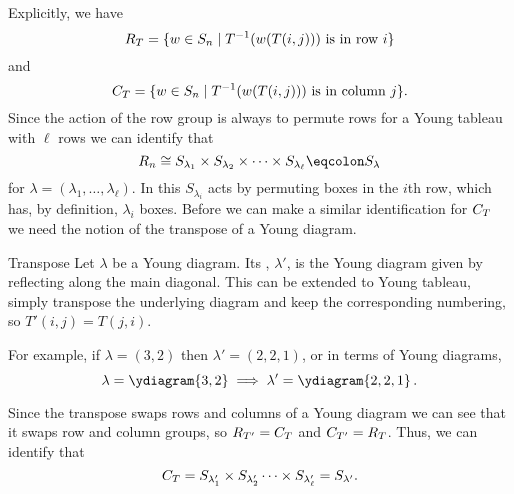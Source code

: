 Explicitly, we have
\begin{equation}
    R_T = \{w \in S_n \mid T^{-1}(w(T(i, j))) \text{ is in row } i\}
\end{equation}
and
\begin{equation}
    C_T = \{w \in S_n \mid T^{-1}(w(T(i, j))) \text{ is in column } j\}.
\end{equation}
Since the action of the row group is always to permute rows for a Young tableau with \(\ell\) rows we can identify that
\begin{equation}
    \rowGroup_n \isomorphic S_{\lambda_1} \times S_{\lambda_2} \times \dotsb \times S_{\lambda_\ell} \eqcolon S_\lambda
\end{equation}
for \(\lambda = (\lambda_1, \dotsc, \lambda_\ell)\).
In this \(S_{\lambda_i}\) acts by permuting boxes in the \(i\)th row, which has, by definition, \(\lambda_i\) boxes.
Before we can make a similar identification for \(C_T\) we need the notion of the transpose of a Young diagram.

\begin{dfn}{Transpose}{}
    Let \(\lambda\) be a Young diagram.
    Its , \(\lambda'\), is the Young diagram given by reflecting along the main diagonal.
    This can be extended to Young tableau, simply transpose the underlying diagram and keep the corresponding numbering, so \(T'(i, j) = T(j, i)\).
\end{dfn}

For example, if \(\lambda = (3, 2)\) then \(\lambda' = (2, 2, 1)\), or in terms of Young diagrams,
\begin{equation}
    \lambda = \ydiagram{3,2} \implies \lambda' = \ydiagram{2,2,1}\,.
\end{equation}

Since the transpose swaps rows and columns of a Young diagram we can see that it swaps row and column groups, so \(R_{T'} = C_T\) and \(C_{T'} = R_T\).
Thus, we can identify that
\begin{equation}
    C_T = S_{\lambda_1'} \times S_{\lambda_2'} \dotsb \times S_{\lambda_{\ell}'} = S_{\lambda'}.
\end{equation}

